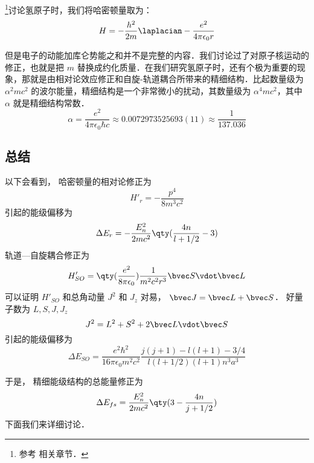 
\begin{issues}
\issueDraft
\end{issues}

\footnote{参考 \cite{GriffQ} 相关章节．}讨论氢原子时，我们将哈密顿量取为：\begin{equation}
H=-\frac{h^2}{2m}\laplacian-\frac{e^2}{4\pi\epsilon_0 r}
\end{equation}

但是电子的动能加库仑势能之和并不是完整的内容．我们讨论过了对原子核运动的修正，也就是把 $m$ 替换成约化质量．在我们研究氢原子时，还有个极为重要的现象，那就是由相对论效应修正和自旋-轨道耦合所带来的精细结构．比起数量级为 $\alpha^2 mc^2$ 的波尔能量，精细结构是一个非常微小的扰动，其数量级为 $\alpha^4 mc^2$，其中 $\alpha$ 就是精细结构常数．
\begin{equation}
\alpha = \frac{e^2}{4\pi\epsilon_0\hbar c} \approx 0.0072973525693(11) \approx \frac{1}{137.036}
\end{equation}

\subsection{总结}
以下会看到， 哈密顿量的相对论修正为
\begin{equation}
H'_r = -\frac{p^4}{8m^3 c^2}
\end{equation}
引起的能级偏移为
\begin{equation}
\Delta E_r = -\frac{E_n^2}{2mc^2} \qty(\frac{4n}{l+1/2}-3)
\end{equation}
轨道—自旋耦合修正为
\begin{equation}
H'_{SO} = \qty(\frac{e^2}{8\pi\epsilon_0}) \frac{1}{m^2c^2 r^3} \bvec S \vdot \bvec L
\end{equation}
可以证明 $H'_{SO}$ 和总角动量 $J^2$ 和 $J_z$ 对易， $\bvec J = \bvec L + \bvec S$． 好量子数为 $L, S, J, J_z$
\begin{equation}
J^2 = L^2 + S^2 + 2\bvec L \vdot \bvec S
\end{equation}
引起的能级偏移为
\begin{equation}
\Delta E_{SO} = \frac{e^2\hbar^2}{16\pi\epsilon_0 m^2 c^2} \frac{j(j+1) - l(l+1) - 3/4}{l(l+1/2)(l+1)n^3 a^3}
\end{equation}

于是， 精细能级结构的总能量修正为
\begin{equation}
\Delta E_{fs} = \frac{E_n^2}{2mc^2}\qty(3 - \frac{4n}{j + 1/2})
\end{equation}
下面我们来详细讨论．

